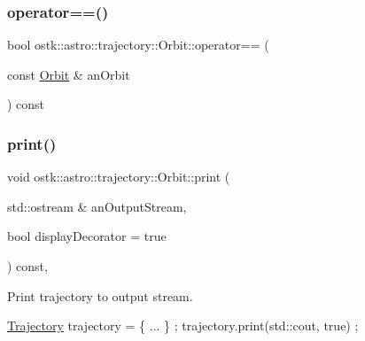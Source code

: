 \mbox{\label{classostk_1_1astro_1_1trajectory_1_1_orbit_aa3fdab43c081059d268984dca953cb7d}} 
\subsubsection{\texorpdfstring{operator==()}{operator==()}}
{\footnotesize\ttfamily bool ostk\+::astro\+::trajectory\+::\+Orbit\+::operator== (\begin{DoxyParamCaption}\item[{const \hyperlink{classostk_1_1astro_1_1trajectory_1_1_orbit}{Orbit} \&}]{an\+Orbit }\end{DoxyParamCaption}) const}

\mbox{\label{classostk_1_1astro_1_1trajectory_1_1_orbit_ae890e832785f84c3f03c1e103f952826}} 
\subsubsection{\texorpdfstring{print()}{print()}}
{\footnotesize\ttfamily void ostk\+::astro\+::trajectory\+::\+Orbit\+::print (\begin{DoxyParamCaption}\item[{std\+::ostream \&}]{an\+Output\+Stream,  }\item[{bool}]{display\+Decorator = {\ttfamily true} }\end{DoxyParamCaption}) const\hspace{0.3cm}{\ttfamily [override]}, {\ttfamily [virtual]}}



Print trajectory to output stream. 


\begin{DoxyCode}
\hyperlink{classostk_1_1astro_1_1_trajectory_a9333200bd6afed5aef4f5aad8a2a8e84}{Trajectory} trajectory = \{ ... \} ;
trajectory.print(std::cout, \textcolor{keyword}{true}) ;
\end{DoxyCode}



